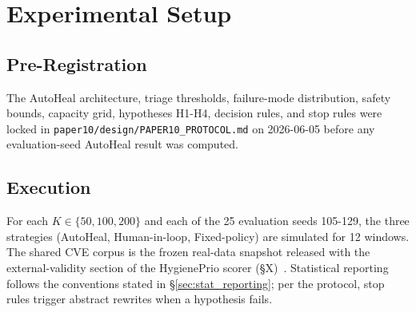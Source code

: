 \section{Experimental Setup}

\subsection{Pre-Registration}

The AutoHeal architecture, triage thresholds, failure-mode
distribution, safety bounds, capacity grid, hypotheses H1-H4,
decision rules, and stop rules were locked in
\texttt{paper10/design/PAPER10\_PROTOCOL.md} on 2026-06-05
before any evaluation-seed AutoHeal result was computed.

\subsection{Execution}

For each $K \in \{50, 100, 200\}$ and each of the 25 evaluation seeds
105-129, the three strategies (AutoHeal, Human-in-loop,
Fixed-policy) are simulated for 12 windows. The shared CVE corpus is
the frozen real-data snapshot released with the external-validity
section of the HygienePrio scorer (\S X)~\cite{paper4hygieneprio}.
Statistical reporting follows the conventions stated in
\S\ref{sec:stat_reporting}; per the protocol, stop rules trigger
abstract rewrites when a hypothesis fails.
